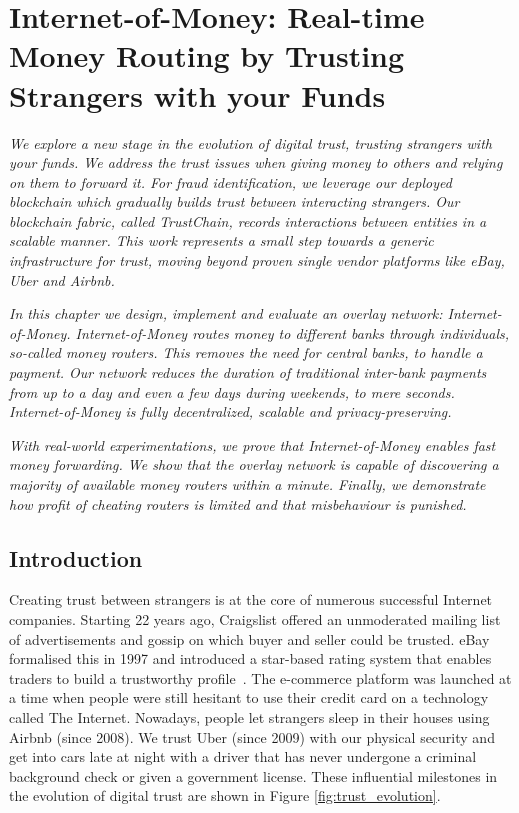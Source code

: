\chapter{Internet-of-Money: Real-time Money Routing by Trusting Strangers with your Funds}
\label{chapter:iom}

\emph{We explore a new stage in the evolution of digital trust, trusting strangers with your funds.
We address the trust issues when giving money to others and relying on them to forward it.
For fraud identification, we leverage our deployed blockchain which gradually builds trust between interacting strangers.
Our blockchain fabric, called \emph{TrustChain}, records interactions between entities in a scalable manner.
This work represents a small step towards a generic infrastructure for trust, moving beyond proven single vendor platforms like eBay, Uber and Airbnb.}

\emph{In this chapter we design, implement and evaluate an overlay network: \emph{Internet-of-Money}.
Internet-of-Money routes money to different banks through individuals, so-called \emph{money routers}.
This removes the need for central banks, to handle a payment.
Our network reduces the duration of traditional inter-bank payments from up to a day and even a few days during weekends, to mere seconds.
Internet-of-Money is fully decentralized, scalable and privacy-preserving.}

\emph{With real-world experimentations, we prove that Internet-of-Money enables fast money forwarding.
We show that the overlay network is capable of discovering a majority of available money routers within a minute.
Finally, we demonstrate how profit of cheating routers is limited and that misbehaviour is punished.}

\newpage

\section{Introduction}
Creating trust between strangers is at the core of numerous successful Internet companies.
Starting 22 years ago, Craigslist offered an unmoderated mailing list of advertisements and gossip on which buyer and seller could be trusted.
eBay formalised this in 1997 and introduced a star-based rating system that enables traders to build a trustworthy profile~\cite{resnick2002trust}.
The e-commerce platform was launched at a time when people were still hesitant to use their credit card on a technology called The Internet.
Nowadays, people let strangers sleep in their houses using Airbnb (since 2008).
We trust Uber (since 2009) with our physical security and get into cars late at night with a driver that has never undergone a criminal background check or given a government license.
These influential milestones in the evolution of digital trust are shown in Figure \ref{fig:trust_evolution}.

